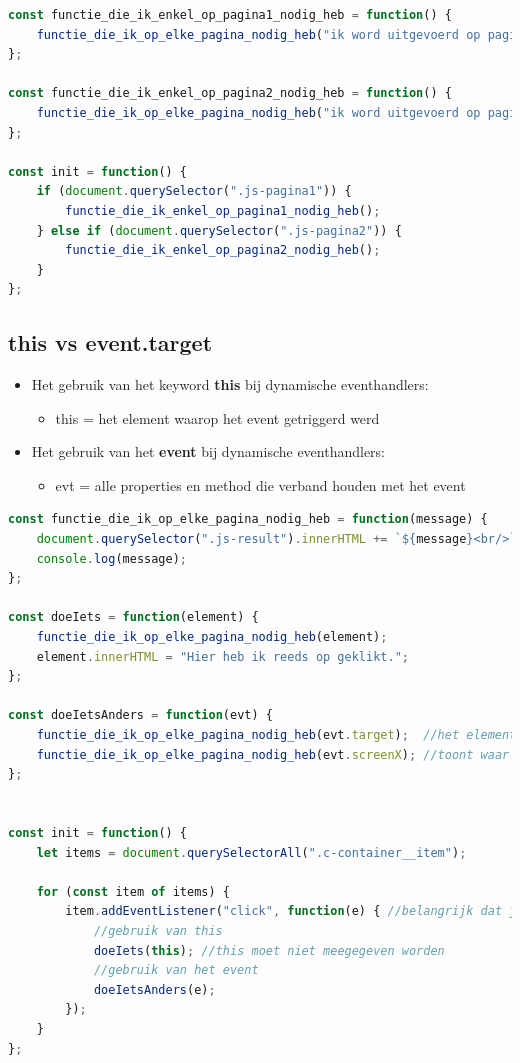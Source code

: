 \documentclass{article}
\newcommand{\bold}[1]{\textbf{#1}}
\begin{document}
\begin{lstlisting}[language=JavaScript]
const functie_die_ik_enkel_op_pagina1_nodig_heb = function() {
    functie_die_ik_op_elke_pagina_nodig_heb("ik word uitgevoerd op pagina 1");
};
    
const functie_die_ik_enkel_op_pagina2_nodig_heb = function() {
    functie_die_ik_op_elke_pagina_nodig_heb("ik word uitgevoerd op pagina 2");
};

const init = function() {
    if (document.querySelector(".js-pagina1")) {
        functie_die_ik_enkel_op_pagina1_nodig_heb();
    } else if (document.querySelector(".js-pagina2")) {
        functie_die_ik_enkel_op_pagina2_nodig_heb();
    }
};
\end{lstlisting}

\subsection{this vs event.target}


\begin{itemize}
    \item Het gebruik van het keyword \bold{this} bij dynamische eventhandlers:
    \begin{itemize}
        \item this = het element waarop het event getriggerd werd
    \end{itemize}
    \item Het gebruik van het \bold{event} bij dynamische eventhandlers:
    \begin{itemize}
        \item evt = alle properties en method die verband houden met het event
    \end{itemize}
\end{itemize}


\begin{lstlisting}[language=JavaScript]
const functie_die_ik_op_elke_pagina_nodig_heb = function(message) {
    document.querySelector(".js-result").innerHTML += `${message}<br/>`;
    console.log(message);
};

const doeIets = function(element) {
    functie_die_ik_op_elke_pagina_nodig_heb(element);
    element.innerHTML = "Hier heb ik reeds op geklikt.";
}; 

const doeIetsAnders = function(evt) {
    functie_die_ik_op_elke_pagina_nodig_heb(evt.target);  //het element waar op geklikt wordt
    functie_die_ik_op_elke_pagina_nodig_heb(evt.screenX); //toont waar de x-positie waar je geklikt hebt
};


const init = function() {
    let items = document.querySelectorAll(".c-container__item");

    for (const item of items) {
        item.addEventListener("click", function(e) { //belangrijk dat je 'e' meegeeft.
            //gebruik van this
            doeIets(this); //this moet niet meegegeven worden
            //gebruik van het event
            doeIetsAnders(e);
        });
    }
};
\end{lstlisting}
\end{document}
